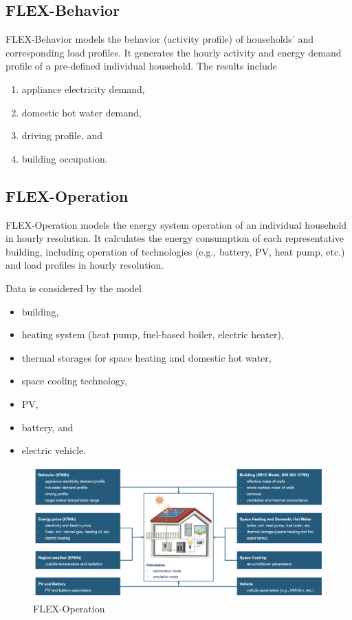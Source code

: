 \subsection{FLEX-Behavior}

FLEX-Behavior models the behavior (activity profile) of households' and corresponding load profiles. 
It generates the hourly activity and energy demand profile of a pre-defined individual household. 
The results include

\begin{enumerate}
  \item appliance electricity demand,
  \item domestic hot water demand,
  \item driving profile, and
  \item building occupation.
\end{enumerate}

\subsection{FLEX-Operation}

FLEX-Operation models the energy system operation of an individual household in hourly resolution.  
It calculates the energy consumption of each representative building, including operation of technologies (e.g., battery, PV, heat pump, etc.) and load profiles in hourly resolution.

Data is considered by the model

\begin{itemize}
  \item building,
  \item heating system (heat pump, fuel-based boiler, electric heater),
  \item thermal storages for space heating and domestic hot water,
  \item space cooling technology,
  \item PV,
  \item battery, and
  \item electric vehicle.
\end{itemize}

\begin{figure}[h]
  \centering
  \includegraphics[width=\textwidth]{Images/flex-operation.png}
  \caption{FLEX-Operation}
  \label{fig:flex-operation}
\end{figure}

